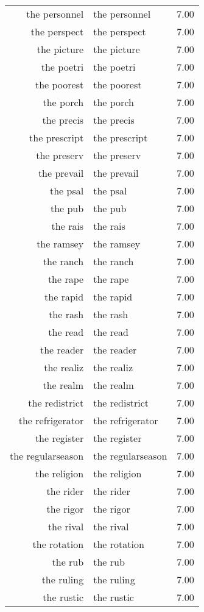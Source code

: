 \begin{table}[ht]
\begin{tabular}{rlr}
  the personnel & the personnel & 7.00 \\ 
  the perspect & the perspect & 7.00 \\ 
  the picture & the picture & 7.00 \\ 
  the poetri & the poetri & 7.00 \\ 
  the poorest & the poorest & 7.00 \\ 
  the porch & the porch & 7.00 \\ 
  the precis & the precis & 7.00 \\ 
  the prescript & the prescript & 7.00 \\ 
  the preserv & the preserv & 7.00 \\ 
  the prevail & the prevail & 7.00 \\ 
  the psal & the psal & 7.00 \\ 
  the pub & the pub & 7.00 \\ 
  the rais & the rais & 7.00 \\ 
  the ramsey & the ramsey & 7.00 \\ 
  the ranch & the ranch & 7.00 \\ 
  the rape & the rape & 7.00 \\ 
  the rapid & the rapid & 7.00 \\ 
  the rash & the rash & 7.00 \\ 
  the read & the read & 7.00 \\ 
  the reader & the reader & 7.00 \\ 
  the realiz & the realiz & 7.00 \\ 
  the realm & the realm & 7.00 \\ 
  the redistrict & the redistrict & 7.00 \\ 
  the refrigerator & the refrigerator & 7.00 \\ 
  the register & the register & 7.00 \\ 
  the regularseason & the regularseason & 7.00 \\ 
  the religion & the religion & 7.00 \\ 
  the rider & the rider & 7.00 \\ 
  the rigor & the rigor & 7.00 \\ 
  the rival & the rival & 7.00 \\ 
  the rotation & the rotation & 7.00 \\ 
  the rub & the rub & 7.00 \\ 
  the ruling & the ruling & 7.00 \\ 
  the rustic & the rustic & 7.00 \\ 

\end{tabular}
\end{table}
